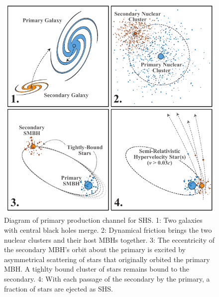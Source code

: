 \documentclass[a4paper,twocolumn]{emulateapj}
\begin{document}
{\begin{figure}
\centering\includegraphics[width=\linewidth,clip=true]{shs-diagram}
\caption{Diagram of primary production channel for SHS. 1: Two galaxies with central black holes merge. 2: Dynamical friction brings the two nuclear clusters and their host MBHs together. 3: The eccentricity of the secondary MBH's orbit about the primary is excited by asymmetrical scattering of stars that originally orbited the primary MBH. A tighlty bound cluster of stars remains bound to the secondary. 4: With each passage of the secondary by the primary, a fraction of stars are ejected as SHS.}
\label{fig:diagram}
\end{figure}

}
\end{document}
